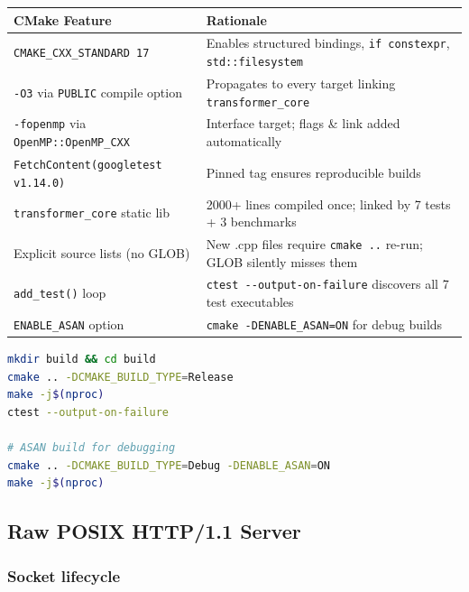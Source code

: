 \documentclass[12pt, a4paper]{article}
\begin{document}
\begin{table}[!ht]
\centering
\renewcommand{\arraystretch}{1.3}
\begin{tabular}{@{} l p{12cm} @{}}
\toprule
\textbf{CMake Feature} & \textbf{Rationale} \\
\midrule
\texttt{CMAKE\_CXX\_STANDARD 17} & Enables structured bindings, \texttt{if constexpr}, \texttt{std::filesystem} \\
\texttt{-O3} via \texttt{PUBLIC} compile option & Propagates to every target linking \texttt{transformer\_core} \\
\texttt{-fopenmp} via \texttt{OpenMP::OpenMP\_CXX} & Interface target; flags \& link added automatically \\
\texttt{FetchContent(googletest v1.14.0)} & Pinned tag ensures reproducible builds \\
\texttt{transformer\_core} static lib & 2000+ lines compiled once; linked by 7 tests + 3 benchmarks \\
Explicit source lists (no GLOB) & New .cpp files require \texttt{cmake ..} re-run; GLOB silently misses them \\
\texttt{add\_test()} loop & \texttt{ctest -{}-output-on-failure} discovers all 7 test executables \\
\texttt{ENABLE\_ASAN} option & \texttt{cmake -DENABLE\_ASAN=ON} for debug builds \\
\bottomrule
\end{tabular}
\end{table}

\begin{tcolorbox}[codebox, title={Quick-start build}]
\begin{lstlisting}[language=bash]
mkdir build && cd build
cmake .. -DCMAKE_BUILD_TYPE=Release
make -j$(nproc)
ctest --output-on-failure

# ASAN build for debugging
cmake .. -DCMAKE_BUILD_TYPE=Debug -DENABLE_ASAN=ON
make -j$(nproc)
\end{lstlisting}
\end{tcolorbox}

\subsection{Raw POSIX HTTP/1.1 Server}

\subsubsection{Socket lifecycle}
\end{document}
